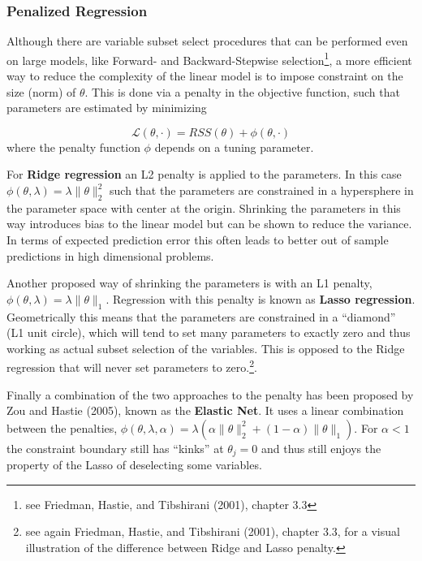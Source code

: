 \documentclass[11pt]{article}
\let\rmarkdownfootnote\footnote%
\def\footnote{\protect\rmarkdownfootnote}
\begin{document}
\hypertarget{penalized-regression}{%
\subsubsection{Penalized Regression}\label{penalized-regression}}

Although there are variable subset select procedures that can be
performed even on large models, like Forward- and Backward-Stepwise
selection\footnote{see Friedman, Hastie, and Tibshirani (2001), chapter
  3.3}, a more efficient way to reduce the complexity of the linear
model is to impose constraint on the size (norm) of \(\theta\). This is done
via a penalty in the objective function, such that parameters are
estimated by minimizing

\[
\mathcal{L}(\theta,\cdot) = RSS(\theta) + \phi(\theta, \cdot)
\] where the penalty function \(\phi\) depends on a tuning parameter.

For \textbf{Ridge regression} an L2 penalty is applied to the
parameters. In this case
\(\phi(\theta, \lambda) = \lambda \|\theta \|_2^2\) such that the
parameters are constrained in a hypersphere in the parameter space with
center at the origin. Shrinking the parameters in this way introduces
bias to the linear model but can be shown to reduce the variance. In
terms of expected prediction error this often leads to better out of
sample predictions in high dimensional problems.

Another proposed way of shrinking the parameters is with an L1 penalty,
\(\phi(\theta, \lambda) = \lambda \|\theta \|_1\). Regression with this
penalty is known as \textbf{Lasso regression}. Geometrically this means
that the parameters are constrained in a ``diamond'' (L1 unit circle),
which will tend to set many parameters to exactly zero and thus working
as actual subset selection of the variables. This is opposed to the
Ridge regression that will never set parameters to zero.\footnote{see
  again Friedman, Hastie, and Tibshirani (2001), chapter 3.3, for a
  visual illustration of the difference between Ridge and Lasso penalty.}.

Finally a combination of the two approaches to the penalty has been
proposed by Zou and Hastie (2005), known as the \textbf{Elastic Net}. It
uses a linear combination between the penalties,
\(\phi(\theta, \lambda, \alpha) = \lambda \left( \alpha \|\theta \|_2^2 + (1-\alpha) \|\theta \|_1 \right)\).
For \(\alpha < 1\) the constraint boundary still has ``kinks'' at
\(\theta_j = 0\) and thus still enjoys the property of the Lasso of
deselecting some variables.
\end{document}
